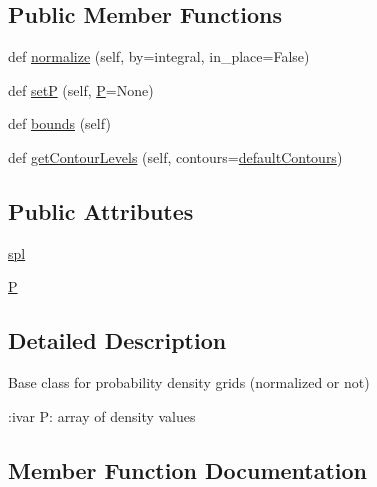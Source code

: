 \subsection*{Public Member Functions}
\begin{DoxyCompactItemize}
\item 
def \mbox{\hyperlink{classgetdist_1_1densities_1_1GridDensity_ae3624f9061f1aa6d8ff480e08924f15e}{normalize}} (self, by=\textquotesingle{}integral\textquotesingle{}, in\+\_\+place=False)
\item 
def \mbox{\hyperlink{classgetdist_1_1densities_1_1GridDensity_a846e4c6346b0b839fbec49eab7570b3e}{setP}} (self, \mbox{\hyperlink{classgetdist_1_1densities_1_1GridDensity_aad3d52edbfbf1a94ecbd0c779bd39dc2}{P}}=None)
\item 
def \mbox{\hyperlink{classgetdist_1_1densities_1_1GridDensity_a223a910e5babc635c48056695544c56b}{bounds}} (self)
\item 
def \mbox{\hyperlink{classgetdist_1_1densities_1_1GridDensity_a33144fef21d2dc029492be256a2e9ee1}{get\+Contour\+Levels}} (self, contours=\mbox{\hyperlink{namespacegetdist_1_1densities_a93d19accaa564f6252d80ae48a40ae3b}{default\+Contours}})
\end{DoxyCompactItemize}
\subsection*{Public Attributes}
\begin{DoxyCompactItemize}
\item 
\mbox{\hyperlink{classgetdist_1_1densities_1_1GridDensity_a82560f102e430ebcd25f8ab8bf140a69}{spl}}
\item 
\mbox{\hyperlink{classgetdist_1_1densities_1_1GridDensity_aad3d52edbfbf1a94ecbd0c779bd39dc2}{P}}
\end{DoxyCompactItemize}


\subsection{Detailed Description}
\begin{DoxyVerb}Base class for probability density grids (normalized or not)

:ivar P: array of density values
\end{DoxyVerb}
 

\subsection{Member Function Documentation}
\mbox{\label{classgetdist_1_1densities_1_1GridDensity_a223a910e5babc635c48056695544c56b}} 
